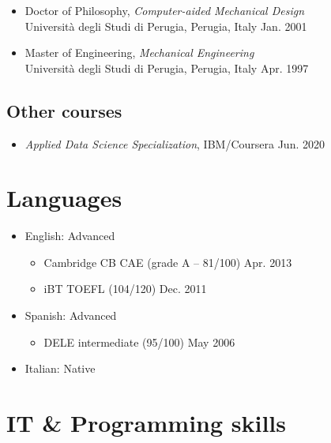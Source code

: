 \documentclass[11pt]{article}
\begin{document}
\begin{itemize}
\item Doctor of Philosophy, 
\emph{Computer-aided Mechanical Design} \\ 
Università degli Studi di Perugia, Perugia, Italy \hfill Jan. 2001 

\item Master of Engineering, \emph{Mechanical Engineering} \\ 
Università degli Studi di Perugia, Perugia, Italy \hfill Apr. 1997
\end{itemize}

\subsection*{Other courses}

\begin{itemize}

\item 
\emph{Applied Data Science Specialization}, IBM/Coursera \hfill Jun. 2020

\end{itemize}

\section*{Languages} 

\begin{itemize}

	\item English: Advanced
	\begin{itemize}
		\item Cambridge CB CAE (grade A -- 81/100) \hfill Apr. 2013
		\item iBT TOEFL (104/120) \hfill Dec. 2011
	\end{itemize}
	\item Spanish: Advanced
	\begin{itemize}
		\item DELE intermediate (95/100) \hfill May 2006
	\end{itemize}\textbf{}
	\item Italian: Native
	
\end{itemize}

\section{IT \& Programming skills} 
\end{document}
